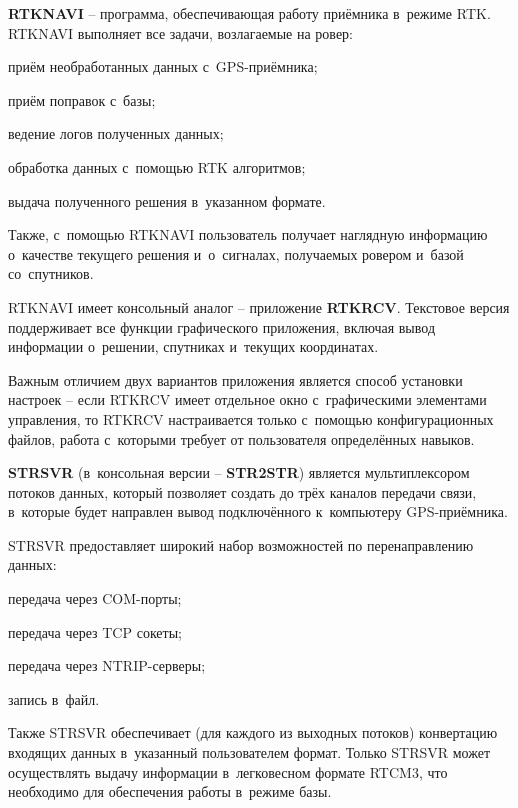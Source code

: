 \begin{dashitemize}
  \item \textbf{RTKNAVI} -- программа, обеспечивающая работу приёмника в~режиме RTK. RTKNAVI выполняет все задачи, возлагаемые на ровер:
  \begin{dashitemize}
    \item приём необработанных данных с~GPS-приёмника;
    \item приём поправок с~базы;
    \item ведение логов полученных данных;
    \item обработка данных с~помощью RTK алгоритмов;
    \item выдача полученного решения в~указанном формате.
  \end{dashitemize}

  Также, с~помощью RTKNAVI пользователь получает наглядную информацию о~качестве текущего решения и~о~сигналах, получаемых ровером и~базой со~спутников. \par
  
  RTKNAVI имеет консольный аналог -- приложение \textbf{RTKRCV}. Текстовое версия поддерживает все функции графического приложения, включая вывод информации о~решении, спутниках и~текущих координатах. \par
  Важным отличием двух вариантов приложения является способ установки настроек -- если RTKRCV имеет отдельное окно с~графическими элементами управления, то RTKRCV настраивается только с~помощью конфигурационных файлов, работа с~которыми требует от пользователя определённых навыков.
  
  \item \textbf{STRSVR} (в~консольная версии -- \textbf{STR2STR}) является мультиплексором потоков данных, который позволяет создать до трёх каналов передачи связи, в~которые будет направлен вывод подключённого к~компьютеру GPS-приёмника. \par
  STRSVR предоставляет широкий набор возможностей по перенаправлению данных:
  
  \begin{dashitemize}
    \item передача через COM-порты;
    \item передача через TCP сокеты;
    \item передача через NTRIP-серверы;
    \item запись в~файл.
  \end{dashitemize}

  Также STRSVR обеспечивает (для каждого из выходных потоков) конвертацию входящих данных в~указанный пользователем формат. Только STRSVR может осуществлять выдачу информации в~легковесном формате RTCM3, что необходимо для обеспечения работы в~режиме базы.
  

\end{dashitemize}
